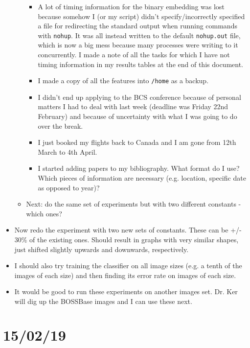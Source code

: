 \documentclass[11pt,a4paper]{report}
\begin{document}
\begin{itemize}
\begin{itemize}
\begin{itemize}
          \item A lot of timing information for the binary embedding was lost because somehow I (or my script) didn't specify/incorrectly specified a file for redirecting the standard output when running commands with \texttt{nohup}. It was all instead written to the default \texttt{nohup.out} file, which is now a big mess because many processes were writing to it concurrently. I made a note of all the tasks for which I have not timing information in my results tables at the end of this document.
          \item I made a copy of all the features into \texttt{/home} as a backup.
          \item I didn't end up applying to the BCS conference because of personal matters I had to deal with last week (deadline was Friday 22nd February) and because of uncertainty with what I was going to do over the break.
          \item I just booked my flights back to Canada and I am gone from 12th March to 4th April.
          \item I started adding papers to my bibliography. What format do I use? Which pieces of information are necessary (e.g. location, specific date as opposed to year)?
        \end{itemize}
      \item Next: do the same set of experiments but with two different constants - which ones?
    \end{itemize}

\item Now redo the experiment with two new sets of constants. These can be +/- 30\% of the existing ones. Should result in graphs with very similar shapes, just shifted slightly upwards and downwards, respectively.

\item I should also try training the classifier on all image sizes (e.g. a tenth of the images of each size) and then finding its error rate on images of each size.

\item It would be good to run these experiments on another images set. Dr. Ker will dig up the BOSSBase images and I can use these next.

\end{itemize}

\section{15/02/19}
\end{document}
